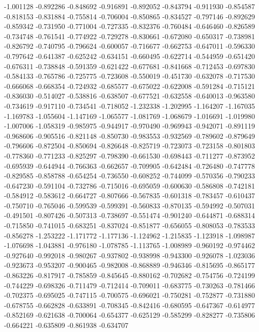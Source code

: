 -1.001128
-0.892286
-0.848692
-0.916891
-0.892052
-0.843794
-0.911930
-0.854587
-0.818153
-0.831884
-0.755814
-0.706004
-0.850865
-0.834527
-0.797146
-0.892629
-0.859342
-0.731950
-0.771004
-0.727335
-0.832376
-0.760484
-0.646460
-0.826589
-0.734748
-0.761541
-0.774922
-0.729278
-0.830661
-0.672080
-0.650317
-0.738981
-0.826792
-0.740795
-0.796624
-0.600057
-0.716677
-0.662753
-0.647011
-0.596330
-0.797642
-0.641387
-0.625242
-0.634151
-0.660495
-0.622714
-0.544959
-0.651420
-0.676311
-0.738848
-0.591359
-0.621422
-0.677681
-0.841668
-0.712453
-0.697830
-0.584133
-0.765786
-0.725775
-0.723608
-0.550019
-0.451730
-0.632078
-0.717530
-0.666068
-0.668354
-0.724932
-0.685577
-0.675022
-0.622008
-0.591284
-0.715121
-0.836030
-0.514027
-0.538816
-0.638507
-0.677521
-0.632558
-0.640013
-0.963580
-0.734619
-0.917110
-0.734541
-0.718052
-1.232338
-1.202995
-1.164207
-1.167035
-1.169783
-1.055604
-1.147169
-1.065577
-1.081769
-1.068679
-1.016691
-1.019980
-1.007006
-1.058319
-0.985975
-0.944917
-0.970490
-0.969943
-0.942071
-0.891119
-0.968606
-0.905516
-0.821148
-0.850730
-0.983553
-0.932569
-0.789602
-0.879649
-0.796606
-0.872504
-0.850694
-0.826648
-0.825719
-0.723073
-0.723158
-0.801803
-0.778360
-0.771233
-0.825297
-0.798390
-0.661530
-0.698443
-0.711277
-0.873952
-0.695939
-0.644944
-0.766363
-0.662657
-0.709905
-0.642484
-0.726480
-0.747778
-0.829585
-0.858788
-0.654254
-0.736550
-0.608252
-0.744099
-0.570356
-0.790233
-0.647230
-0.591104
-0.732786
-0.715016
-0.695059
-0.600630
-0.586808
-0.742181
-0.584912
-0.583612
-0.664727
-0.807666
-0.567835
-0.601318
-0.783457
-0.610437
-0.750710
-0.765046
-0.599539
-0.599391
-0.560833
-0.870135
-0.594992
-0.507031
-0.491501
-0.807426
-0.507313
-0.738697
-0.551474
-0.901240
-0.644871
-0.688314
-0.715850
-0.741015
-0.683251
-0.837024
-0.851877
-0.656055
-0.808053
-0.783533
-0.856278
-1.253222
-1.171772
-1.177136
-1.124962
-1.215835
-1.123918
-1.098987
-1.076698
-1.043881
-0.976180
-1.078785
-1.113765
-1.008989
-0.960192
-0.974462
-0.927640
-0.992018
-0.980267
-0.937802
-0.938998
-0.943300
-0.926078
-1.023036
-0.923673
-0.953207
-0.900465
-0.982008
-0.868889
-0.946346
-0.815695
-0.865177
-0.863226
-0.817917
-0.785859
-0.845645
-0.880162
-0.702682
-0.754756
-0.724199
-0.744229
-0.698326
-0.711479
-0.712414
-0.709011
-0.683775
-0.730263
-0.781466
-0.702375
-0.695025
-0.747115
-0.700575
-0.696021
-0.750281
-0.752877
-0.731880
-0.678755
-0.662828
-0.633891
-0.708345
-0.842416
-0.680595
-0.647367
-0.614977
-0.852169
-0.621638
-0.700064
-0.654377
-0.625129
-0.585299
-0.828277
-0.735806
-0.664221
-0.635809
-0.861938
-0.634707
